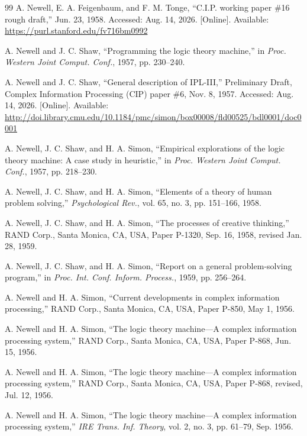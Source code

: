 \documentclass[journal]{IEEEtran}
\begin{document}
\begin{thebibliography}{99}
 A. Newell, E. A. Feigenbaum, and F. M. Tonge,
  ``C.I.P. working paper \#16 rough draft,'' Jun. 23, 1958.
  Accessed: Aug. 14, 2026.  [Online].
  Available: \url{https://purl.stanford.edu/fv716bm0992}

 A. Newell and J. C. Shaw, ``Programming the
  logic theory machine,'' in \textit{Proc. Western Joint
  Comput. Conf.}, 1957, pp. 230--240.

 A. Newell and J. C. Shaw,
  ``General description of IPL-III,''
  Preliminary Draft, Complex Information Processing (CIP) paper \#6,
  Nov. 8, 1957.
  Accessed: Aug. 14, 2026.  [Online].
  Available: \url{http://doi.library.cmu.edu/10.1184/pmc/simon/box00008/fld00525/bdl0001/doc0001}

 A. Newell, J. C. Shaw, and H. A. Simon, ``Empirical
  explorations of the logic theory machine: A case study in
  heuristic,'' in \textit{Proc. Western Joint Comput. Conf.}, 1957,
  pp. 218--230.

 A. Newell, J. C. Shaw, and H. A. Simon,
  ``Elements of a theory of human problem solving,''
  \textit{Psychological Rev.}, vol. 65, no. 3, pp. 151--166, 1958.

 A. Newell, J. C. Shaw, and H. A. Simon,
  ``The processes of creative thinking,''
  RAND Corp., Santa Monica, CA, USA, Paper P-1320,
  Sep. 16, 1958, revised Jan. 28, 1959.

 A. Newell, J. C. Shaw, and H. A. Simon,
  ``Report on a general problem-solving program,'' in
  \textit{Proc. Int. Conf. Inform. Process.}, 1959, pp. 256--264.

 A. Newell and H. A. Simon,
  ``Current developments in complex information processing,''
  RAND Corp., Santa Monica, CA, USA, Paper P-850, May 1, 1956.

 A. Newell and H. A. Simon,
  ``The logic theory machine---A complex information processing system,''
  RAND Corp., Santa Monica, CA, USA, Paper P-868, Jun. 15, 1956.

 A. Newell and H. A. Simon,
  ``The logic theory machine---A complex information processing system,''
  RAND Corp., Santa Monica, CA, USA, Paper P-868, revised, Jul. 12, 1956.

 A. Newell and H. A. Simon, ``The logic theory
  machine---A complex information processing system,'' \textit{IRE
  Trans. Inf. Theory}, vol. 2, no. 3, pp. 61--79, Sep. 1956.


\end{thebibliography}
\end{document}
